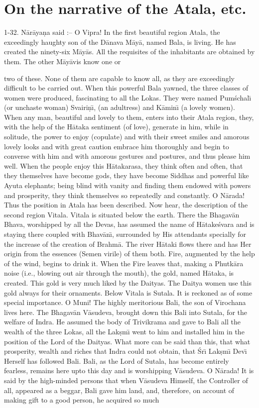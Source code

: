 \chapter{On the narrative of the Atala, etc.}

1-32. N\=ar\=aya\d{n}a said :-- O Vipra! In the first beautiful region Atala, the exceedingly haughty son of the D\=anava M\=ay\=a, named Bala, is living. He has created the ninety-six M\=ay\=as. All the requisites of the inhabitants are obtained by them. The other M\=ay\=avis know one or

two of these. None of them are capable to know all, as they are exceedingly difficult to be carried out. When this powerful Bala yawned, the three classes of women were produced, fascinating to all the Lokas. They were named Pum\'schal\={\i} (or unchaste woman) Svairi\d{n}\={\i}, (an adultress) and K\=amin\={\i} (a lovely women). When any man, beautiful and lovely to them, enters into their Atala region, they, with the help of the H\=ataka sentiment (of love), generate in him, while in solitude, the power to enjoy (copulate) and with their sweet smiles and amorous lovely looks and with great caution embrace him thoroughly and begin to converse with him and with amorous gestures and postures, and thus please him well. When the people enjoy this H\=atakarasa, they think often and often, that they themselves have become gods, they have become Siddhas and powerful like Ayuta elephants; being blind with vanity and finding them endowed with powers and prosperity, they think themselves so repeatedly and constantly. O N\=arada! Thus the position in Atala has been described. Now hear, the description of the second region Vitala. Vitala is situated below the earth. There the Bhagav\=an Bhava, worshipped by all the Devas, has assumed the name of H\=atake\'svara and is staying there coupled with Bhav\=an\={\i}, surrounded by His attendants specially for the increase of the creation of Brahm\=a. The river H\=ataki flows there and has Her origin from the essences (Semen virile) of them both. Fire, augmented by the help of the wind, begins to drink it. When the Fire leaves that, making a Phutk\=ara noise (i.e., blowing out air through the mouth), the gold, named H\=ataka, is created. This gold is very much liked by the Daityas. The Daitya women use this gold always for their ornaments. Below Vitala is Sutala. It is reckoned as of some special importance. O Muni! The highly meritorious Bali, the son of Virochana lives here. The Bhagav\=an V\=asudeva, brought down this Bali into Sutala, for the welfare of Indra. He assumed the body of Trivikrama and gave to Bali all the wealth of the three Lokas, all the Lak\d{s}m\={\i} went to him and installed him in the position of the Lord of the Daityas. What more can be said than this, that what prosperity, wealth and riches that Indra could not obtain, that \'Sr\={\i} Lak\d{s}m\={\i} Dev\={\i} Herself has followed Bali. Bali, as the Lord of Sutala, has become entirely fearless, remains here upto this day and is worshipping V\=asudeva. O N\=arada! It is said by the high-minded persons that when V\=asudeva Himself, the Controller of all, appeared as a beggar, Bali gave him land, and, therefore, on account of making gift to a good person, he acquired so much 